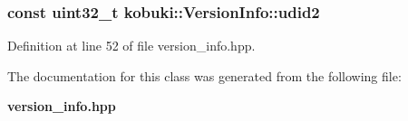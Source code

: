 \subsubsection[{udid2}]{\setlength{\rightskip}{0pt plus 5cm}const uint32\-\_\-t {\bf kobuki\-::\-Version\-Info\-::udid2}}\label{classkobuki_1_1VersionInfo_a555c1f0acba7ce4c21d20022d2b214b5}


\-Definition at line 52 of file version\-\_\-info.\-hpp.



\-The documentation for this class was generated from the following file\-:\begin{DoxyCompactItemize}
\item 
{\bf version\-\_\-info.\-hpp}\end{DoxyCompactItemize}
